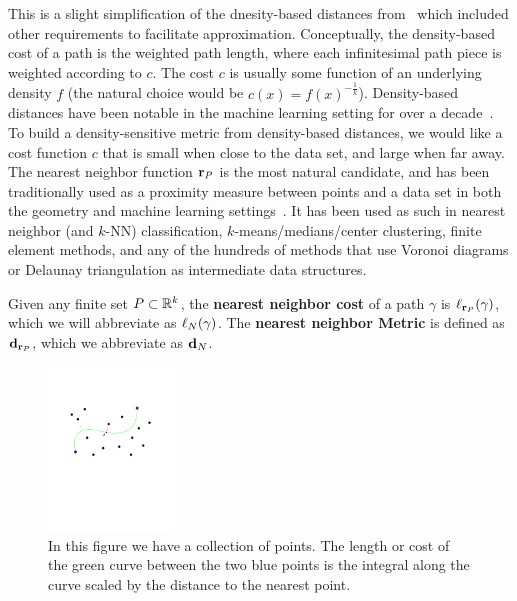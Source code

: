 This is a slight simplification of the dnesity-based distances from~\cite{sajama05estimatingDBDM} which included other requirements to facilitate approximation.
Conceptually, the density-based cost of a path is the weighted path length, where each infinitesimal path piece is weighted according to $c$.
The cost $c$ is usually some function of an underlying density $f$ (the natural choice would be $c(x) = f(x)^{-\frac{1}{k}}$).
Density-based distances have been notable in the machine learning setting for over a decade~\cite{sajama05estimatingDBDM,bijral11semiSupLearningDBD}.
To build a density-sensitive metric from density-based distances, we would like a cost function $c$ that is small when close to the data set, and large when far away.
The nearest neighbor function $\mathbf{r}_P$ is the most natural candidate, and has been traditionally used as a proximity measure between points and a data set in both the geometry and machine learning settings~\cite{}. It has been used as such in nearest neighbor
(and $k$-NN) classification, $k$-means/medians/center clustering, finite
element methods, and any of the hundreds of methods that use Voronoi
diagrams or Delaunay triangulation as intermediate data structures.

\begin{definition} Given any finite set $P\subset \mathbb{R}^k$, the \textbf{nearest neighbor cost} of a path $\gamma$ is $\ell_{\mathbf{r}_P}(\gamma)$, which we will abbreviate as
$\ell_N(\gamma)$.
The \textbf{nearest neighbor Metric} is
defined as $\mathbf{d}_{\mathbf{r}_P}$, which we abbreviate as $\mathbf{d}_N$.
\end{definition}
\begin{figure}[htbp]
  \centering
    \includegraphics[width=0.3\textwidth]{Figures/example.pdf}
    \caption{In this figure we have a collection of points.
      The length or cost of the green curve between the two blue points
      is the integral along the curve scaled by the distance to the nearest
point.}
  \label{fig:example}
\end{figure}

